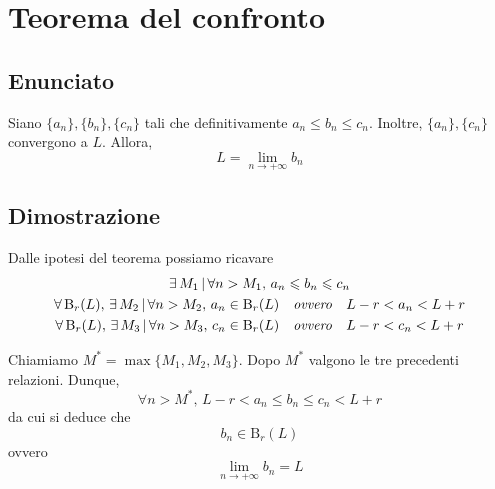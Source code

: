 \documentclass[../../dimostrazioni]{subfiles}
\begin{document}
    \chapter{Teorema del confronto}

        \section*{Enunciato}

            Siano \(\{a_n\}, \{b_n\}, \{c_n\}\) tali che definitivamente \(a_n \leqslant b_n \leqslant c_n\).
            Inoltre, \(\{a_n\}, \{c_n\}\) convergono a \(L\). Allora,
            \[
                L = \lim_{n \to +\infty} b_n
            \]

        \section*{Dimostrazione}

            Dalle ipotesi del teorema possiamo ricavare
            \begin{gather*}
                \exists \, M_1 \, | \, \forall n > M_1, \, a_n \leqslant b_n \leqslant c_n\\
                \forall \, \mathrm{B}_r (L), \, \exists \, M_2 \, | \, \forall n > M_2, \, a_n \in \mathrm{B}_r (L) \quad \text{\emph{ovvero}} \quad L - r < a_n < L + r\\
                \forall \, \mathrm{B}_r (L), \, \exists \, M_3 \, | \, \forall n > M_3, \, c_n \in \mathrm{B}_r (L) \quad \text{\emph{ovvero}} \quad L - r < c_n < L + r
            \end{gather*}

            Chiamiamo \(M^* = \max\{M_1, M_2, M_3\}\). Dopo \(M^*\) valgono le tre precedenti relazioni. Dunque,
            \[
                \forall n > M^*, \, L - r < a_n \leqslant b_n \leqslant c_n < L + r
            \]
            da cui si deduce che
            \[
                b_n \in \mathrm{B}_r (L)
            \]
            ovvero
            \[
                \lim_{n \to +\infty} b_n = L
            \]
    
\end{document}
